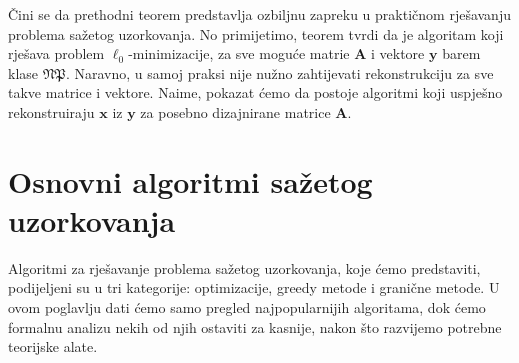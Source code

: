 \documentclass[a4paper,twoside,12pt]{memoir} %
\newcommand{\vect}[1]{\mathbf{#1}}
\renewcommand{\vec}{\vect}
\begin{document}
\v{C}ini se da prethodni teorem predstavlja ozbiljnu zapreku u prakti\v{c}nom rje\v{s}avanju problema sa\v{z}etog uzorkovanja. No primijetimo, teorem tvrdi da je algoritam koji rje\v{s}ava problem $\ell_0$-minimizacije, za sve mogu\'ce matrie $\vec A$ i vektore $\vec y$ barem klase $\mathfrak{NP}$. Naravno, u samoj praksi nije nu\v{z}no zahtijevati rekonstrukciju za sve takve matrice i vektore. Naime, pokazat \'cemo da postoje algoritmi koji uspje\v{s}no rekonstruiraju $\vec x$ iz $\vec y$ za posebno dizajnirane matrice $\vec A$.




\chapter[Osnovni algoritmi sa\v{z}etog uzorkovanja][Osnovni algoritmi sa\v{z}etog uzorkovanja]{Osnovni algoritmi sa\v{z}etog uzorkovanja}\label{chapter_algoritmi}
Algoritmi za rje\v{s}avanje problema sa\v{z}etog uzorkovanja, koje \'cemo predstaviti, podijeljeni su u tri kategorije: optimizacije, greedy metode i grani\v{c}ne metode. U ovom poglavlju dati \'cemo samo pregled najpopularnijih algoritama, dok \'cemo formalnu analizu nekih od njih ostaviti za kasnije, nakon \v{s}to razvijemo potrebne teorijske alate.
\end{document}
